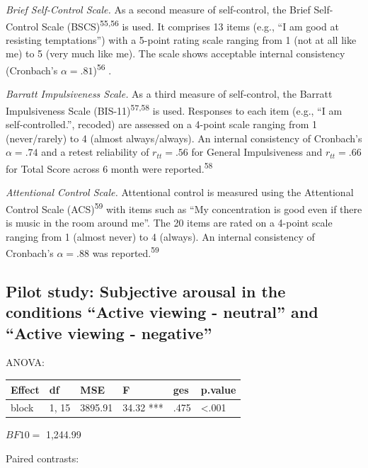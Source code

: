 \documentclass[
  english,
  man,floatsintext]{apa6}
\begin{document}
\emph{Brief Self-Control Scale.}
As a second measure of self-control, the Brief Self-Control Scale (BSCS)\textsuperscript{55,56} is used.
It comprises 13 items (e.g., ``I am good at resisting temptations'') with a 5-point rating scale ranging from 1 (not at all like me) to 5 (very much like me).
The scale shows acceptable internal consistency (Cronbach's \(\alpha=.81\))\textsuperscript{56} .

\emph{Barratt Impulsiveness Scale.}
As a third measure of self-control, the Barratt Impulsiveness Scale (BIS-11)\textsuperscript{57,58} is used.
Responses to each item (e.g., ``I am self-controlled.'', recoded) are assessed on a 4-point scale ranging from 1 (never/rarely) to 4 (almost always/always).
An internal consistency of Cronbach's \(\alpha=.74\) and a retest reliability of \(r_{tt}=.56\) for General Impulsiveness and \(r_{tt}=.66\) for Total Score across 6 month were reported.\textsuperscript{58}

\emph{Attentional Control Scale.}
Attentional control is measured using the Attentional Control Scale (ACS)\textsuperscript{59} with items such as ``My concentration is good even if there is music in the room around me''.
The 20 items are rated on a 4-point scale ranging from 1 (almost never) to 4 (always).
An internal consistency of Cronbach's \(\alpha=.88\) was reported.\textsuperscript{59}

\newpage

\hypertarget{pilot-study-subjective-arousal-in-the-conditions-active-viewing---neutral-and-active-viewing---negative}{%
\subsection{Pilot study: Subjective arousal in the conditions ``Active viewing - neutral'' and ``Active viewing - negative''}\label{pilot-study-subjective-arousal-in-the-conditions-active-viewing---neutral-and-active-viewing---negative}}

ANOVA:

\begin{tabular}{l|l|l|l|l|l}
\hline
Effect & df & MSE & F & ges & p.value\\
\hline
block & 1, 15 & 3895.91 & 34.32 *** & .475 & <.001\\
\hline
\end{tabular}

\(BF10=\) 1,244.99

Paired contrasts:
\end{document}
